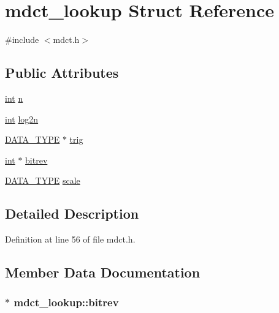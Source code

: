 \hypertarget{structmdct__lookup}{}\section{mdct\+\_\+lookup Struct Reference}
\label{structmdct__lookup}


{\ttfamily \#include $<$mdct.\+h$>$}

\subsection*{Public Attributes}
\begin{DoxyCompactItemize}
\item 
\hyperlink{xmltok_8h_a5a0d4a5641ce434f1d23533f2b2e6653}{int} \hyperlink{structmdct__lookup_a593e7827bf9dda70f513223af3169a2d}{n}
\item 
\hyperlink{xmltok_8h_a5a0d4a5641ce434f1d23533f2b2e6653}{int} \hyperlink{structmdct__lookup_a0caa60b1e24a982eeacdbe31aeca55ab}{log2n}
\item 
\hyperlink{mdct_8h_afb8c72ce35c4a1f4a2588d6573e54aa1}{D\+A\+T\+A\+\_\+\+T\+Y\+PE} $\ast$ \hyperlink{structmdct__lookup_af94ca2b1bc4a58c9088d3abcc375c4f1}{trig}
\item 
\hyperlink{xmltok_8h_a5a0d4a5641ce434f1d23533f2b2e6653}{int} $\ast$ \hyperlink{structmdct__lookup_ac0d249b62917cc3efe31878122b11404}{bitrev}
\item 
\hyperlink{mdct_8h_afb8c72ce35c4a1f4a2588d6573e54aa1}{D\+A\+T\+A\+\_\+\+T\+Y\+PE} \hyperlink{structmdct__lookup_a6072369aa974e03908b9a0d73bdb8d2d}{scale}
\end{DoxyCompactItemize}


\subsection{Detailed Description}


Definition at line 56 of file mdct.\+h.



\subsection{Member Data Documentation}
\subsubsection[{\texorpdfstring{bitrev}{bitrev}}]{$\ast$ mdct\+\_\+lookup\+::bitrev}\hypertarget{structmdct__lookup_ac0d249b62917cc3efe31878122b11404}{}\label{structmdct__lookup_ac0d249b62917cc3efe31878122b11404}


